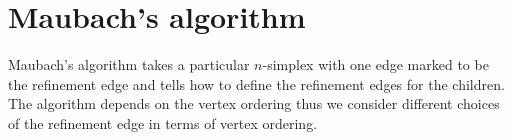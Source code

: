 \documentclass[a4paper,12pt]{amsart}
\numberwithin{equation}{section}
\begin{document}
%
%
%

\section{Maubach's algorithm}

Maubach's algorithm takes a particular $n$-simplex with one edge marked to be the refinement edge and tells how to define the refinement edges for the children. The algorithm depends on the vertex ordering thus we consider different choices of the refinement edge in terms of vertex ordering.
\end{document}
